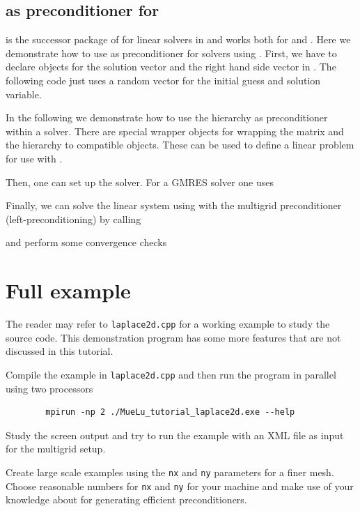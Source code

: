 \documentclass[10pt,fleqn]{book}
\providecommand\printCppListing[1]{

}
\begin{document}
\subsection{\muelu as preconditioner for \belos}
\label{sec:muelu_belospreconditioner}

\belos is the successor package of \aztecoo for linear solvers in \trilinos and works both for \epetra and \tpetra. Here we demonstrate how to use \muelu as preconditioner for \belos solvers using \xpetra.
First, we have to declare objects for the solution vector and the right hand side vector in \xpetra. The following code just uses a random vector for the initial guess and solution variable.
\printCppListing{ScalingTest.cpp_24.fragment}

In the following we demonstrate how to use the \muelu hierarchy as preconditioner within a \belos solver. There are special wrapper objects for wrapping the \xpetra matrix and the \muelu hierarchy to \belos compatible objects. These can be used to define a linear problem for use with \belos.
\printCppListing{ScalingTest.cpp_26.fragment}

Then, one can set up the \belos solver. For a \belos GMRES solver one uses
\printCppListing{ScalingTest.cpp_28.fragment}
Finally, we can solve the linear system using \belos with the \muelu multigrid preconditioner (left-preconditioning) by calling
\printCppListing{ScalingTest.cpp_30.fragment}
and perform some convergence checks
\printCppListing{ScalingTest.cpp_32.fragment}

\section{Full example}

The reader may refer to \texttt{laplace2d.cpp} for a working example to study the source code. This demonstration program has some more features that are not discussed in this tutorial.

\begin{exercise}
Compile the example in \texttt{laplace2d.cpp} and then run the program in parallel using two processors
        \begin{verbatim}
        mpirun -np 2 ./MueLu_tutorial_laplace2d.exe --help
        \end{verbatim}
        Study the screen output and try to run the example with an XML file as input for the multigrid setup.
\end{exercise}
\begin{exercise}
Create large scale examples using the \verb|nx| and \verb|ny| parameters for a finer mesh. Choose reasonable numbers for \verb|nx| and \verb|ny| for your machine and make use of your knowledge about \muelu for generating efficient preconditioners.
\end{exercise}
\end{document}
